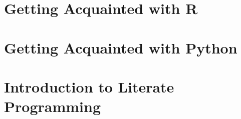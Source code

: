 
\section{Getting Acquainted with R}


\section{Getting Acquainted with Python}


\section{Introduction to Literate Programming}

